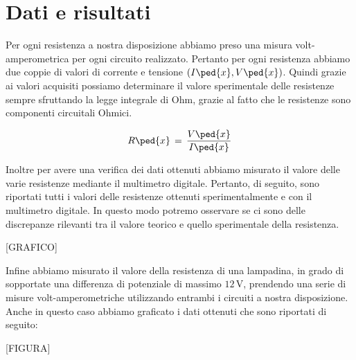 \section*{Dati e risultati}

Per ogni resistenza a nostra disposizione abbiamo preso una misura volt-amperometrica per ogni circuito realizzato. Pertanto per ogni resistenza abbiamo due coppie di valori di corrente e tensione $(I\ped{x}, V\ped{x})$.
Quindi grazie ai valori acquisiti possiamo determinare il valore sperimentale delle resistenze sempre sfruttando la legge integrale di Ohm, grazie al fatto che le resistenze sono componenti circuitali Ohmici.

\begin{equation}
	R\ped{x} \,=\, \frac{V\ped{x}}{I\ped{x}}
\end{equation}

Inoltre per avere una verifica dei dati ottenuti abbiamo misurato il valore delle varie resistenze mediante il multimetro digitale.
Pertanto, di seguito, sono riportati tutti i valori delle resistenze ottenuti sperimentalmente e con il multimetro digitale. In questo modo potremo osservare se ci sono delle discrepanze rilevanti tra il valore teorico e quello sperimentale della resistenza. 

[GRAFICO]

Infine abbiamo misurato il valore della resistenza di una lampadina, in grado di sopportate una differenza di potenziale di massimo $12\,\si{\volt}$, prendendo una serie di misure volt-amperometriche utilizzando entrambi i circuiti a nostra disposizione.
Anche in questo caso abbiamo graficato i dati ottenuti che sono riportati di seguito:

[FIGURA]
